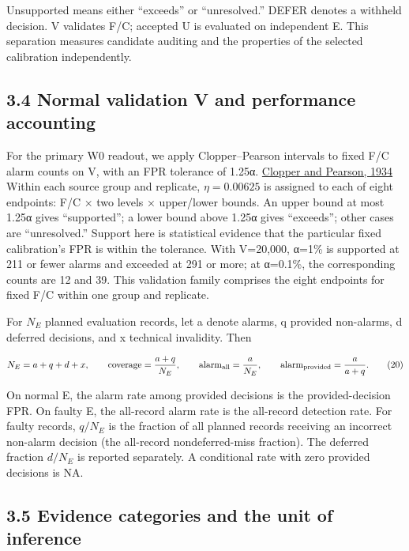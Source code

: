 \documentclass[10pt,a4paper]{article}
\begin{document}
Unsupported means either “exceeds” or “unresolved.” DEFER denotes a withheld decision. V validates F/C; accepted U is evaluated on independent E. This separation measures candidate auditing and the properties of the selected calibration independently.

\subsection{3.4 Normal validation V and performance accounting}

For the primary W0 readout, we apply Clopper–Pearson intervals to fixed F/C alarm counts on V, with an FPR tolerance of 1.25α. \href{https://doi.org/10.1093/biomet/26.4.404}{Clopper and Pearson, 1934} Within each source group and replicate, \(\eta=0.00625\) is assigned to each of eight endpoints: F/C × two levels × upper/lower bounds. An upper bound at most 1.25α gives “supported”; a lower bound above 1.25α gives “exceeds”; other cases are “unresolved.” Support here is statistical evidence that the particular fixed calibration's FPR is within the tolerance. With V=20,000, α=1\% is supported at 211 or fewer alarms and exceeded at 291 or more; at α=0.1\%, the corresponding counts are 12 and 39. This validation family comprises the eight endpoints for fixed F/C within one group and replicate.

For \(N_E\) planned evaluation records, let a denote alarms, q provided non-alarms, d deferred decisions, and x technical invalidity. Then

\begin{equation}
N_E=a+q+d+x,\qquad
\mathrm{coverage}=\frac{a+q}{N_E},\qquad
\mathrm{alarm}_{\rm all}=\frac{a}{N_E},\qquad
\mathrm{alarm}_{\rm provided}=\frac{a}{a+q}.
\tag{20}
\end{equation}

On normal E, the alarm rate among provided decisions is the provided-decision FPR. On faulty E, the all-record alarm rate is the all-record detection rate. For faulty records, \(q/N_E\) is the fraction of all planned records receiving an incorrect non-alarm decision (the all-record nondeferred-miss fraction). The deferred fraction \(d/N_E\) is reported separately. A conditional rate with zero provided decisions is NA.

\subsection{3.5 Evidence categories and the unit of inference}
\end{document}
